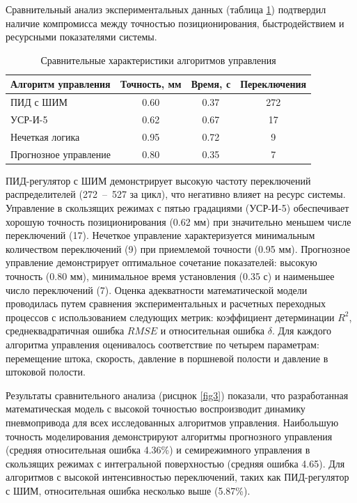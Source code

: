 Сравнительный анализ экспериментальных данных (таблица \ref{tab2}) подтвердил
наличие компромисса между точностью позиционирования, быстродействием и ресурсными показателями системы.
\begin{table}[h]
	\centering
	\caption{Сравнительные характеристики алгоритмов управления}
	\label{tab2}
	\small
	\begin{tabular}{lccc}
		\hline
		\textbf{Алгоритм управления} & \textbf{Точность, мм} & \textbf{Время, с} & \textbf{Переключения} \\
		\hline
		ПИД с ШИМ                    & \num{0.60}            & \num{0.37}        & 272                   \\
		УСР-И-5                      & \num{0.62}            & \num{0.67}        & 17                    \\
		Нечеткая логика              & \num{0.95}            & \num{0.72}        & 9                     \\
		Прогнозное управление        & \num{0.80}            & \num{0.35}        & 7                     \\
		\hline
	\end{tabular}
\end{table}
ПИД-регулятор с ШИМ демонстрирует высокую частоту переключений распределителей
(272~--~527 за цикл), что негативно влияет на ресурс системы. Управление
в скользящих режимах с пятью градациями (УСР-И-5) обеспечивает хорошую точность
позиционирования (\num{0.62} мм) при значительно меньшем числе переключений (17). Нечеткое управление
характеризуется минимальным количеством переключений (9) при приемлемой точности (\num{0.95} мм).
Прогнозное управление демонстрирует оптимальное сочетание показателей: высокую точность (\num{0.80} мм),
минимальное время установления (\num{0.35} с) и наименьшее число переключений (7).
Оценка адекватности математической модели проводилась путем сравнения экспериментальных и
расчетных переходных процессов с использованием следующих метрик: коэффициент детерминации
$R^2$, среднеквадратичная ошибка $RMSE$ и относительная ошибка $\delta$. Для каждого алгоритма
управления оценивалось соответствие по четырем параметрам: перемещение штока, скорость,
давление в поршневой полости и давление в штоковой полости.

Результаты сравнительного анализа (рисцнок \ref{fig3}) показали, что разработанная математическая модель
с высокой точностью воспроизводит динамику пневмопривода для всех исследованных алгоритмов управления.
Наибольшую точность моделирования демонстрируют алгоритмы прогнозного управления (средняя относительная ошибка \num{4.36}\%)
и семирежимного управления в скользящих режимах с интегральной поверхностью (средняя ошибка \num{4.65}). Для алгоритмов
с высокой интенсивностью переключений, таких как ПИД-регулятор с ШИМ, относительная ошибка несколько выше (\num{5.87}\%).

